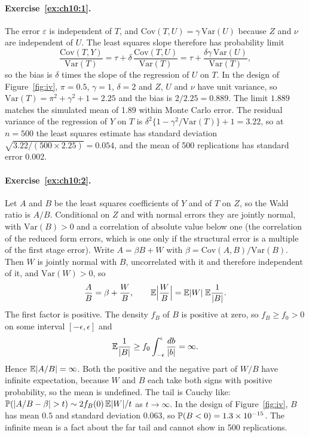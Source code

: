 \paragraph{Exercise~\ref{ex:ch10:1}.} The error $\varepsilon$ is independent of $T$, and $\mathrm{Cov}(T, U) = \gamma\,\mathrm{Var}(U)$ because $Z$ and $\nu$ are independent of $U$. The least squares slope therefore has probability limit
\[
\frac{\mathrm{Cov}(T, Y)}{\mathrm{Var}(T)} = \tau + \delta\,\frac{\mathrm{Cov}(T, U)}{\mathrm{Var}(T)} = \tau + \frac{\delta\gamma\,\mathrm{Var}(U)}{\mathrm{Var}(T)},
\]
so the bias is $\delta$ times the slope of the regression of $U$ on $T$. In the design of Figure~\ref{fig:iv}, $\pi = 0.5$, $\gamma = 1$, $\delta = 2$ and $Z$, $U$ and $\nu$ have unit variance, so $\mathrm{Var}(T) = \pi^2 + \gamma^2 + 1 = 2.25$ and the bias is $2/2.25 = 0.889$. The limit $1.889$ matches the simulated mean of 1.89 within Monte Carlo error. The residual variance of the regression of $Y$ on $T$ is $\delta^2\{1 - \gamma^2/\mathrm{Var}(T)\} + 1 = 3.22$, so at $n = 500$ the least squares estimate has standard deviation $\sqrt{3.22/(500 \times 2.25)} = 0.054$, and the mean of 500 replications has standard error 0.002. 

\paragraph{Exercise~\ref{ex:ch10:2}.} Let $A$ and $B$ be the least squares coefficients of $Y$ and of $T$ on $Z$, so the Wald ratio is $A/B$. Conditional on $Z$ and with normal errors they are jointly normal, with $\mathrm{Var}(B) > 0$ and a correlation of absolute value below one (the correlation of the reduced form errors, which is one only if the structural error is a multiple of the first stage error). Write $A = \beta B + W$ with $\beta = \mathrm{Cov}(A, B)/\mathrm{Var}(B)$. Then $W$ is jointly normal with $B$, uncorrelated with it and therefore independent of it, and $\mathrm{Var}(W) > 0$, so
\[
\frac{A}{B} = \beta + \frac{W}{B}, \qquad \mathbb{E}\Bigl|\frac{W}{B}\Bigr| = \mathbb{E}|W|\;\mathbb{E}\frac{1}{|B|}.
\]
The first factor is positive. The density $f_B$ of $B$ is positive at zero, so $f_B \geq f_0 > 0$ on some interval $[-\epsilon, \epsilon]$ and
\[
\mathbb{E}\frac1{|B|} \geq f_0\int_{-\epsilon}^{\epsilon}\frac{db}{|b|} = \infty.
\]
Hence $\mathbb{E}|A/B| = \infty$. Both the positive and the negative part of $W/B$ have infinite expectation, because $W$ and $B$ each take both signs with positive probability, so the mean is undefined. The tail is Cauchy like: $\mathbb{P}(|A/B - \beta| > t) \sim 2f_B(0)\,\mathbb{E}|W|/t$ as $t \to \infty$. In the design of Figure~\ref{fig:iv}, $B$ has mean $0.5$ and standard deviation $0.063$, so $\mathbb{P}(B < 0) = 1.3 \times 10^{-15}$. The infinite mean is a fact about the far tail and cannot show in 500 replications.

